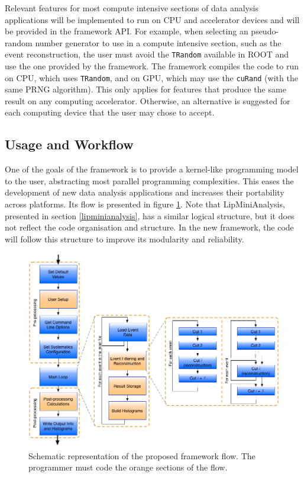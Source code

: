 Relevant features for most compute intensive sections of data analysis applications will be implemented to run on CPU and accelerator devices and will be provided in the framework API. For example, when selecting an pseudo-random number generator to use in a compute intensive section, such as the event reconstruction, the user must avoid the \texttt{TRandom} available in ROOT and use the one provided by the framework. The framework compiles the code to run on CPU, which uses \texttt{TRandom}, and on GPU, which may use the \texttt{cuRand} (with the same PRNG algorithm). This only applies for features that produce the same result on any computing accelerator. Otherwise, an alternative is suggested for each computing device that the user may chose to accept.

\subsection{Usage and Workflow}
\label{usage_workflow}

One of the goals of the framework is to provide a kernel-like programming model to the user, abstracting most parallel programming complexities. This eases the development of new data analysis applications and increases their portability across platforms. Its flow is presented in figure \ref{fig:new_framework_flow}. Note that LipMiniAnalysis, presented in section \ref{lipminianalysis}, has a similar logical structure, but it does not reflect the code organisation and structure. In the new framework, the code will follow this structure to improve its modularity and reliability.

\begin{figure}[!htp]
	\begin{center}
		\includegraphics[scale=0.5]{imgs/new_framework_flow.png}
		\caption{Schematic representation of the proposed framework flow. The programmer must code the orange sections of the flow.}
		\label{fig:new_framework_flow}
	\end{center}
\end{figure}

